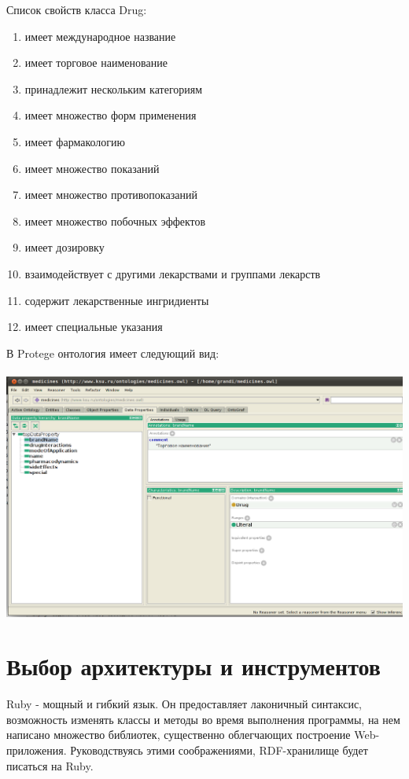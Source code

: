\documentclass[specialist,subf,href,colorlinks=true
]{disser}
\begin{document}
Список свойств класса Drug:
\begin{enumerate}
 \item имеет международное название
 \item имеет торговое наименование
 \item принадлежит нескольким категориям
 \item имеет множество форм применения
 \item имеет фармакологию
 \item имеет множество показаний
 \item имеет множество противопоказаний
 \item имеет множество побочных эффектов
 \item имеет дозировку
 \item взаимодействует с другими лекарствами и группами лекарств
 \item содержит лекарственные ингридиенты
 \item имеет специальные указания
\end{enumerate}
В Protege онтология имеет следующий вид:
\\ 
\\ \includegraphics[width=160mm]{2.png}

\section{Выбор архитектуры и инструментов}

Ruby - мощный и гибкий язык. Он предоставляет лаконичный синтаксис, возможность изменять классы и методы во время выполнения программы, на нем написано множество библиотек, существенно облегчающих построение Web-приложения. Руководствуясь этими соображениями, RDF-хранилище будет писаться на Ruby.
\end{document}
